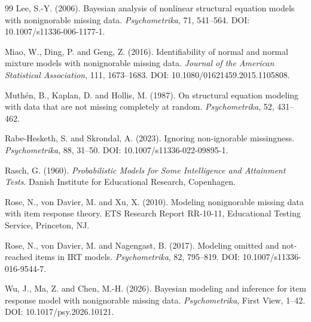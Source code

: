 \documentclass[11pt,a4paper]{ltjsarticle}
\theoremstyle{remark}
\begin{document}
\begin{thebibliography}{99}
Lee, S.-Y. (2006).
Bayesian analysis of nonlinear structural equation models with nonignorable missing data.
\emph{Psychometrika}, 71, 541--564.
DOI: 10.1007/s11336-006-1177-1.

Miao, W., Ding, P. and Geng, Z. (2016).
Identifiability of normal and normal mixture models with nonignorable missing data.
\emph{Journal of the American Statistical Association}, 111, 1673--1683.
DOI: 10.1080/01621459.2015.1105808.

Muth\'en, B., Kaplan, D. and Hollis, M. (1987).
On structural equation modeling with data that are not missing completely at random.
\emph{Psychometrika}, 52, 431--462.

Rabe-Hesketh, S. and Skrondal, A. (2023).
Ignoring non-ignorable missingness.
\emph{Psychometrika}, 88, 31--50.
DOI: 10.1007/s11336-022-09895-1.

Rasch, G. (1960).
\emph{Probabilistic Models for Some Intelligence and Attainment Tests}.
Danish Institute for Educational Research, Copenhagen.

Rose, N., von Davier, M. and Xu, X. (2010).
Modeling nonignorable missing data with item response theory.
ETS Research Report RR-10-11, Educational Testing Service, Princeton, NJ.

Rose, N., von Davier, M. and Nagengast, B. (2017).
Modeling omitted and not-reached items in IRT models.
\emph{Psychometrika}, 82, 795--819.
DOI: 10.1007/s11336-016-9544-7.

Wu, J., Ma, Z. and Chen, M.-H. (2026).
Bayesian modeling and inference for item response model with nonignorable missing data.
\emph{Psychometrika}, First View, 1--42.
DOI: 10.1017/psy.2026.10121.

\end{thebibliography}
\end{document}
